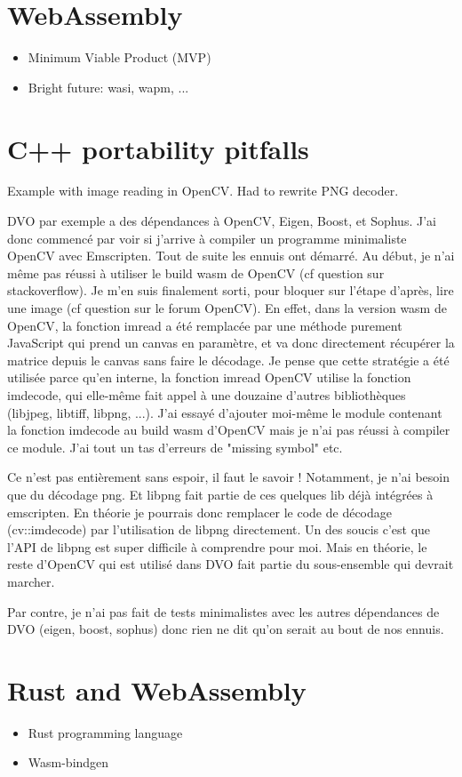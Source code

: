 \section{WebAssembly}%
\label{sec:WebAssembly}

\begin{itemize}
	\item Minimum Viable Product (MVP)
	\item Bright future: wasi, wapm, ...
\end{itemize}

\section{C++ portability pitfalls}%
\label{sec:cpp_pitfalls}

Example with image reading in OpenCV.
Had to rewrite PNG decoder.


DVO par exemple a des dépendances à OpenCV, Eigen, Boost, et Sophus. J’ai donc commencé par voir si j’arrive à compiler un programme minimaliste OpenCV avec Emscripten. Tout de suite les ennuis ont démarré. Au début, je n’ai même pas réussi à utiliser le build wasm de OpenCV (cf question sur stackoverflow). Je m’en suis finalement sorti, pour bloquer sur l’étape d’après, lire une image (cf question sur le forum OpenCV). En effet, dans la version wasm de OpenCV, la fonction imread a été remplacée par une méthode purement JavaScript qui prend un canvas en paramètre, et va donc directement récupérer la matrice depuis le canvas sans faire le décodage. Je pense que cette stratégie a été utilisée parce qu’en interne, la fonction imread OpenCV utilise la fonction imdecode, qui elle-même fait appel à une douzaine d’autres bibliothèques (libjpeg, libtiff, libpng, ...). J’ai essayé d’ajouter moi-même le module contenant la fonction imdecode au build wasm d’OpenCV mais je n’ai pas réussi à compiler ce module. J’ai tout un tas d’erreurs de "missing symbol" etc.

Ce n’est pas entièrement sans espoir, il faut le savoir ! Notamment, je n’ai besoin que du décodage png. Et libpng fait partie de ces quelques lib déjà intégrées à emscripten. En théorie je pourrais donc remplacer le code de décodage (cv::imdecode) par l’utilisation de libpng directement. Un des soucis c’est que l’API de libpng est super difficile à comprendre pour moi. Mais en théorie, le reste d’OpenCV qui est utilisé dans DVO fait partie du sous-ensemble qui devrait marcher.

Par contre, je n’ai pas fait de tests minimalistes avec les autres dépendances de DVO (eigen, boost, sophus) donc rien ne dit qu’on serait au bout de nos ennuis.

\section{Rust and WebAssembly}%
\label{sec:rust_wasm}

\begin{itemize}
	\item Rust programming language
	\item Wasm-bindgen
\end{itemize}
